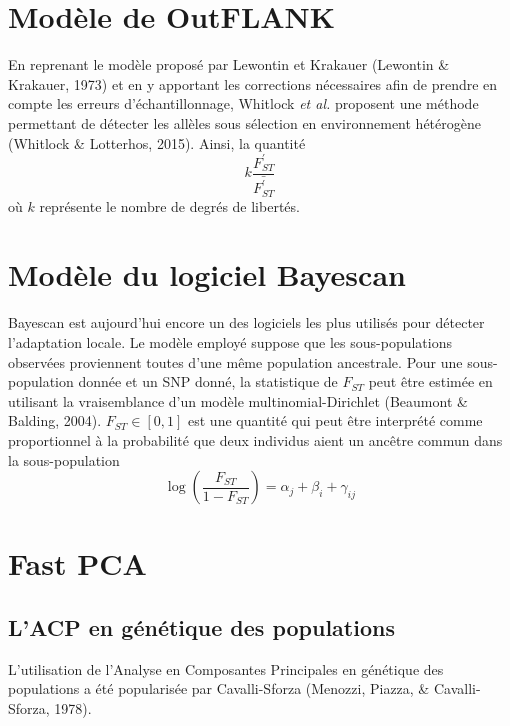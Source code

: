 \documentclass[12pt,twoside]{ugathesis}
\begin{document}
\section{Modèle de OutFLANK}\label{modele-de-outflank}

En reprenant le modèle proposé par Lewontin et Krakauer (Lewontin \&
Krakauer, 1973) et en y apportant les corrections nécessaires afin de
prendre en compte les erreurs d'échantillonnage, Whitlock
\textit{et al.} proposent une méthode permettant de détecter les allèles
sous sélection en environnement hétérogène (Whitlock \& Lotterhos,
2015). Ainsi, la quantité
\begin{equation} 
  k \frac{F_{ST}^{\prime}}{\bar{{F_{ST}^{\prime}}}}  
  \label{eq:OutFLANK-statistic}
\end{equation}
où \(k\) représente le nombre de degrés de libertés.

\section{Modèle du logiciel Bayescan}\label{modele-du-logiciel-bayescan}

Bayescan est aujourd'hui encore un des logiciels les plus utilisés pour
détecter l'adaptation locale. Le modèle employé suppose que les
sous-populations observées proviennent toutes d'une même population
ancestrale. Pour une sous-population donnée et un SNP donné, la
statistique de \(F_{ST}\) peut être estimée en utilisant la
vraisemblance d'un modèle multinomial-Dirichlet (Beaumont \& Balding,
2004). \(F_{ST} \in [0, 1]\) est une quantité qui peut être interprété
comme proportionnel à la probabilité que deux individus aient un ancêtre
commun dans la sous-population
\begin{equation} 
  \log \left( \frac{F_{ST}}{1 - F_{ST}} \right) = \alpha_j + \beta_i + \gamma_{ij}
  \label{eq:Bayescan-statistic}
\end{equation}
\section{Fast PCA}\label{fast-pca}

\subsection{L'ACP en génétique des
populations}\label{lacp-en-genetique-des-populations}

L'utilisation de l'Analyse en Composantes Principales en génétique des
populations a été popularisée par Cavalli-Sforza (Menozzi, Piazza, \&
Cavalli-Sforza, 1978).
\end{document}
